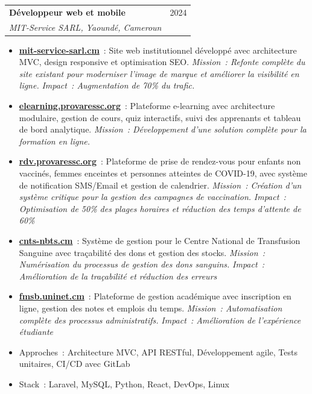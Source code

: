 \documentclass[12pt, a4paper]{article}
\begin{document}
\vspace{6pt}
\noindent\begin{tabularx}{\linewidth}{@{}X r@{}}
  {\bfseries\color{primary}D\'eveloppeur web et mobile} &
  {\small\textcolor{textgray}{2024}} \\
  {\itshape\color{textgray}MIT-Service SARL, Yaound\'e, Cameroun} & \\
\end{tabularx}
\begin{itemize}[leftmargin=1.4em, itemsep=1pt, topsep=2pt, parsep=0pt]
  \item \href{https://mit-service-sarl.cm/}{\textbf{mit-service-sarl.cm}}~: Site web institutionnel d\'evelopp\'e avec architecture MVC, design responsive et optimisation SEO. \textit{Mission~: Refonte compl\`ete du site existant pour moderniser l'image de marque et am\'eliorer la visibilit\'e en ligne.} \textit{Impact~: Augmentation de 70\% du trafic.}
  \item \href{https://elearning.provaressc.org/}{\textbf{elearning.provaressc.org}}~: Plateforme e-learning avec architecture modulaire, gestion de cours, quiz interactifs, suivi des apprenants et tableau de bord analytique. \textit{Mission~: D\'eveloppement d'une solution compl\`ete pour la formation en ligne.}
  \item \href{https://rdv.provaressc.org/}{\textbf{rdv.provaressc.org}}~: Plateforme de prise de rendez-vous pour enfants non vaccin\'es, femmes enceintes et personnes atteintes de COVID-19, avec syst\`eme de notification SMS/Email et gestion de calendrier. \textit{Mission~: Cr\'eation d'un syst\`eme critique pour la gestion des campagnes de vaccination.} \textit{Impact~: Optimisation de 50\% des plages horaires et r\'eduction des temps d'attente de 60\%}
  \item \href{https://cnts-nbts.cm/}{\textbf{cnts-nbts.cm}}~: Syst\`eme de gestion pour le Centre National de Transfusion Sanguine avec tra\c{c}abilit\'e des dons et gestion des stocks. \textit{Mission~: Num\'erisation du processus de gestion des dons sanguins.} \textit{Impact~: Am\'elioration de la tra\c{c}abilit\'e et r\'eduction des erreurs}
  \item \href{https://fmsb.uninet.cm/}{\textbf{fmsb.uninet.cm}}~: Plateforme de gestion acad\'emique avec inscription en ligne, gestion des notes et emplois du temps. \textit{Mission~: Automatisation compl\`ete des processus administratifs.} \textit{Impact~: Am\'elioration de l'exp\'erience \'etudiante}
  \item Approches~: Architecture MVC, API RESTful, D\'eveloppement agile, Tests unitaires, CI/CD avec GitLab
  \item Stack~: Laravel, MySQL, Python, React, DevOps, Linux
\end{itemize}
\end{document}
